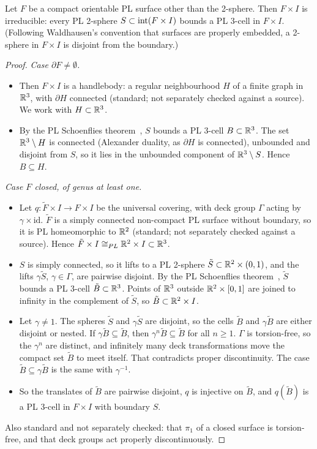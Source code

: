 \begin{lemma}\label{lem:irreducible}
Let $F$ be a compact orientable PL surface other than the 2-sphere. Then $F\times I$ is irreducible: every PL
2-sphere $S\subset\operatorname{int}(F\times I)$ bounds a PL 3-cell in $F\times I$. (Following Waldhausen's convention that surfaces
are properly embedded, a 2-sphere in $F\times I$ is disjoint from the boundary.)
\end{lemma}
\begin{proof}
\emph{Case $\partial F\ne\emptyset$.}
\begin{itemize}
\item Then $F\times I$ is a handlebody: a regular neighbourhood $H$ of a finite graph in $\mathbb{R}^3$, with $\partial H$
connected (standard; not separately checked against a source). We work with $H\subset\mathbb{R}^3$.
\item By the PL Schoenflies theorem~\cite[Thm.~17.12]{Moise77}, $S$ bounds a PL 3-cell $B\subset\mathbb{R}^3$. The set
$\mathbb{R}^3\setminus H$ is connected (Alexander duality, as $\partial H$ is connected), unbounded and disjoint from $S$, so it
lies in the unbounded component of $\mathbb{R}^3\setminus S$. Hence $B\subseteq H$.
\end{itemize}
\emph{Case $F$ closed, of genus at least one.}
\begin{itemize}
\item Let $q\colon\tilde F\times I\to F\times I$ be the universal covering, with deck group $\Gamma$ acting by
$\gamma\times\mathrm{id}$. $\tilde F$ is a simply connected non-compact PL surface without boundary, so it is PL
homeomorphic to $\mathbb{R}^2$ (standard; not separately checked against a source). Hence $\tilde F\times I\cong_{PL}\mathbb{R}^2\times
I\subset\mathbb{R}^3$.
\item $S$ is simply connected, so it lifts to a PL 2-sphere $\tilde S\subset\mathbb{R}^2\times(0,1)$, and the lifts $\gamma\tilde S$,
$\gamma\in\Gamma$, are pairwise disjoint. By the PL Schoenflies theorem~\cite[Thm.~17.12]{Moise77}, $\tilde S$ bounds a
PL 3-cell $\tilde B\subset\mathbb{R}^3$. Points of $\mathbb{R}^3$ outside $\mathbb{R}^2\times[0,1]$ are joined to infinity in the complement of
$\tilde S$, so $\tilde B\subset\mathbb{R}^2\times I$.
\item Let $\gamma\ne1$. The spheres $\tilde S$ and $\gamma\tilde S$ are disjoint, so the cells $\tilde B$ and
$\gamma\tilde B$ are either disjoint or nested. If $\gamma\tilde B\subseteq\tilde B$, then $\gamma^n\tilde B\subseteq\tilde
B$ for all $n\ge1$. $\Gamma$ is torsion-free, so the $\gamma^n$ are distinct, and infinitely many deck transformations
move the compact set $\tilde B$ to meet itself. That contradicts proper discontinuity. The case $\tilde B\subseteq
\gamma\tilde B$ is the same with $\gamma^{-1}$.
\item So the translates of $\tilde B$ are pairwise disjoint, $q$ is injective on $\tilde B$, and $q(\tilde B)$ is a PL
3-cell in $F\times I$ with boundary $S$.
\end{itemize}
Also standard and not separately checked: that $\pi_1$ of a closed surface is torsion-free, and that deck groups act
properly discontinuously.
\end{proof}

